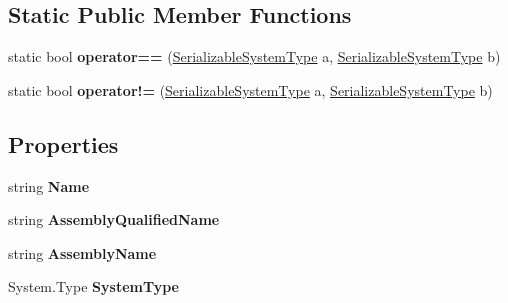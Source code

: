 \subsection*{Static Public Member Functions}
\begin{DoxyCompactItemize}
\item 
\mbox{\label{class_heureka_games_1_1_serializable_system_type_ac813f82b3b49ad83136d567dff52e584}} 
static bool {\bfseries operator==} (\hyperlink{class_heureka_games_1_1_serializable_system_type}{Serializable\+System\+Type} a, \hyperlink{class_heureka_games_1_1_serializable_system_type}{Serializable\+System\+Type} b)
\item 
\mbox{\label{class_heureka_games_1_1_serializable_system_type_abcd18d39d23d2ba540139367c738b7cf}} 
static bool {\bfseries operator!=} (\hyperlink{class_heureka_games_1_1_serializable_system_type}{Serializable\+System\+Type} a, \hyperlink{class_heureka_games_1_1_serializable_system_type}{Serializable\+System\+Type} b)
\end{DoxyCompactItemize}
\subsection*{Properties}
\begin{DoxyCompactItemize}
\item 
\mbox{\label{class_heureka_games_1_1_serializable_system_type_aa73c6e7e1bab7fd30cd98d5c5a843904}} 
string {\bfseries Name}
\item 
\mbox{\label{class_heureka_games_1_1_serializable_system_type_af366067c2dfba97b5fb1b7c241d3cca3}} 
string {\bfseries Assembly\+Qualified\+Name}
\item 
\mbox{\label{class_heureka_games_1_1_serializable_system_type_a18f97965b92f7975d8a734141eca285d}} 
string {\bfseries Assembly\+Name}
\item 
\mbox{\label{class_heureka_games_1_1_serializable_system_type_a6f1621673a1a8d8ae9b367c112beee21}} 
System.\+Type {\bfseries System\+Type}
\end{DoxyCompactItemize}
